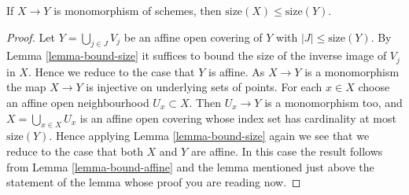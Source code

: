 \begin{lemma}
\label{lemma-bound-monomorphism}
If $X \to Y$ is monomorphism of schemes, then
$\text{size}(X) \leq \text{size}(Y)$.
\end{lemma}

\begin{proof}
Let $Y = \bigcup_{j \in J} V_j$ be an affine open covering of $Y$
with $|J| \leq \text{size}(Y)$. By
Lemma \ref{lemma-bound-size}
it suffices to bound the size of the inverse image of $V_j$ in $X$.
Hence we reduce to the case that $Y$ is affine.
As $X \to Y$ is a monomorphism the map $X \to Y$ is injective on underlying
sets of points. For each $x \in X$ choose an affine open neighbourhood
$U_x \subset X$. Then $U_x \to Y$ is a monomorphism too, and
$X = \bigcup_{x \in X} U_x$ is an affine open covering whose index set
has cardinality at most $\text{size}(Y)$. Hence applying
Lemma \ref{lemma-bound-size}
again we see that we reduce to the case that both $X$ and $Y$ are affine.
In this case the result follows from
Lemma \ref{lemma-bound-affine}
and the lemma mentioned just above the statement of the lemma whose
proof you are reading now.
\end{proof}

